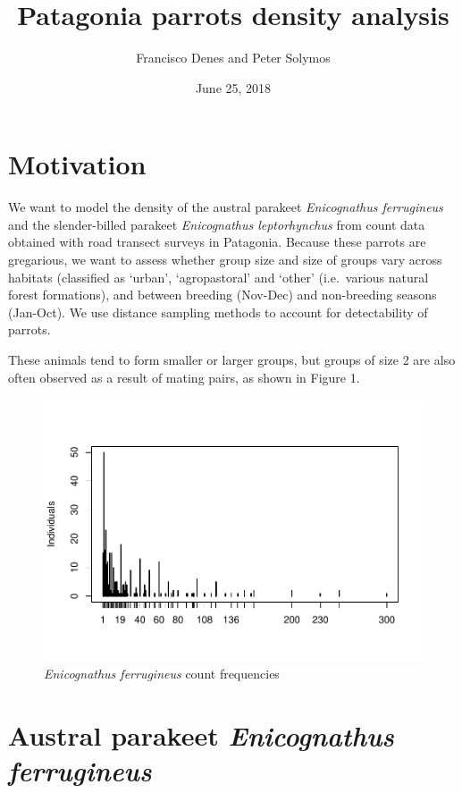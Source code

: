\documentclass[]{article}
\title{Patagonia parrots density analysis}
\author{Francisco Denes and Peter Solymos}
\date{June 25, 2018}
\begin{document}
\maketitle

\section{Motivation}\label{motivation}

We want to model the density of the austral parakeet \emph{Enicognathus
ferrugineus} and the slender-billed parakeet \emph{Enicognathus
leptorhynchus} from count data obtained with road transect surveys in
Patagonia. Because these parrots are gregarious, we want to assess
whether group size and size of groups vary across habitats (classified
as `urban', `agropastoral' and `other' (i.e.~various natural forest
formations), and between breeding (Nov-Dec) and non-breeding seasons
(Jan-Oct). We use distance sampling methods to account for detectability
of parrots.

These animals tend to form smaller or larger groups, but groups of size
2 are also often observed as a result of mating pairs, as shown in
Figure 1.

\begin{figure}[H]
\includegraphics{Patagonia_parrots_density_analysis_files/figure-latex/unnamed-chunk-1-1} \caption{\textit{Enicognathus ferrugineus} count frequencies}\label{fig:unnamed-chunk-1}
\end{figure}

\section{\texorpdfstring{Austral parakeet \emph{Enicognathus
ferrugineus}}{Austral parakeet Enicognathus ferrugineus}}\label{austral-parakeet-enicognathus-ferrugineus}
\end{document}
